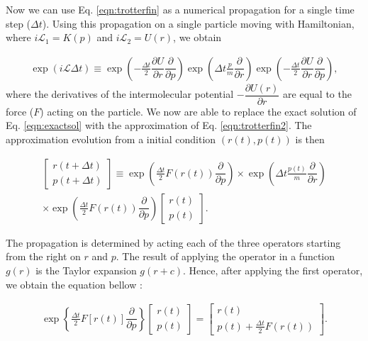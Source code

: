 Now we can use Eq. \ref{eqn:trotterfin} as a numerical propagation for a single time step ($\Delta t$). Using this propagation on a single particle moving with Hamiltonian, where $i\mathcal{L}_{1} = K (p)$ and $i\mathcal{L}_{2} = U (r)$, we obtain

\begin{equation}
\begin{aligned}
\exp (i\mathcal{L} \Delta t)  \equiv
\exp \left (-\frac{\Delta t}{2} \dfrac{\partial U}{\partial r} \dfrac{\partial}{\partial p} \right) \exp \left( \Delta t \frac{p}{m}\dfrac{\partial }{\partial r} \right)\exp \left (-\frac{\Delta t}{2} \dfrac{\partial U}{\partial r} \dfrac{\partial}{\partial p} \right) ,
\end{aligned}
\label{eqn:trotterfin2}
\end{equation} 
where the derivatives of the intermolecular potential $-\dfrac{\partial U(r)}{\partial r}$ are equal to the force ($F$) acting on the particle. We now are able to replace the exact solution of Eq. \ref{eqn:exactsol} with the approximation of Eq. \ref{eqn:trotterfin2}. The approximation evolution from a initial condition $(r(t),p(t))$  is then

\begin{equation}
\begin{aligned}
\left[ \begin{array}{c} r(t+ \Delta t) \\ p(t + \Delta t) \end{array} \right] \equiv 
\exp \left (\frac{\Delta t}{2} F(r(t)) \dfrac{\partial}{\partial p} \right) 
\times \exp \left( \Delta t \frac{p(t)}{m}\dfrac{\partial }{\partial r} \right) \\
\times \exp \left (\frac{\Delta t}{2} F(r(t)) \dfrac{\partial}{\partial p} \right)
\left[ \begin{array}{c} r(t) \\ p(t) \end{array} \right] .
\end{aligned}
\end{equation}

The propagation is determined by acting each of the three operators starting from the right on $r$ and $p$. The result of applying the operator in a function $g(r)$ is the Taylor expansion $g(r+c)$. Hence,  after applying the first operator, we obtain the equation bellow \cite{tuckerman}:

\begin{equation}
\begin{aligned}
\exp \left \lbrace \frac{\Delta t}{2} F[r(t)] \dfrac{\partial}{\partial p} \right \rbrace
\left[ \begin{array}{c} r(t) \\ p(t) \end{array} \right] = 
\left[ \begin{array}{c} r(t) \\ p(t) + \frac{\Delta t}{2} F(r(t)) \end{array} \right] .
\end{aligned}
\end{equation}

